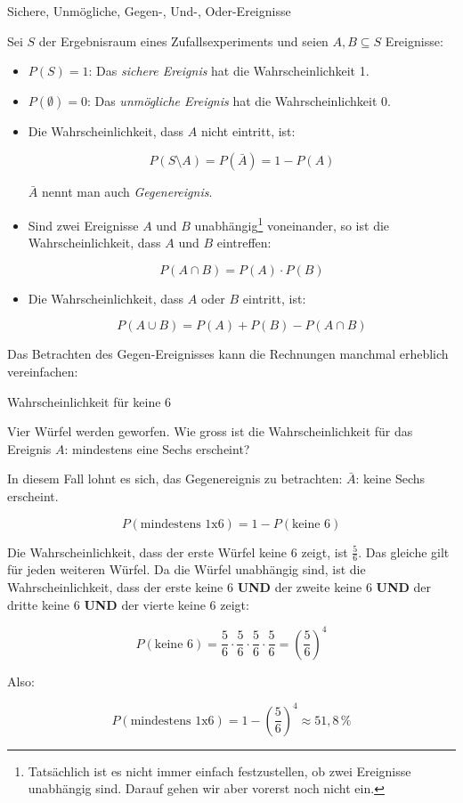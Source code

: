 \begin{definition}
    {Sichere, Unmögliche, Gegen-, Und-, Oder-Ereignisse}{}

Sei \(S\) der Ergebnisraum eines Zufallsexperiments und seien \(A, B \subseteq S\) Ereignisse:

\begin{itemize}
    \item \(P(S) = 1\): Das \emph{sichere Ereignis} hat die Wahrscheinlichkeit 1.
    \item \(P(\emptyset) = 0\): Das \emph{unmögliche Ereignis} hat die Wahrscheinlichkeit 0.


\item Die Wahrscheinlichkeit, dass \(A\) nicht eintritt, ist:

\[
P(S \setminus A) = P(\bar{A}) = 1 - P(A)
\]

\( \bar{A} \) nennt man auch \emph{Gegenereignis}.

\item  Sind zwei Ereignisse \(A\) und \(B\) unabhängig\footnote{Tatsächlich ist es nicht immer einfach festzustellen, ob zwei Ereignisse unabhängig sind. Darauf gehen wir aber vorerst noch nicht ein.} voneinander, so ist die Wahrscheinlichkeit, dass \(A\) und \(B\) eintreffen:

\[
P(A \cap B) = P(A) \cdot P(B)
\]

\item Die Wahrscheinlichkeit, dass \(A\) oder \(B\) eintritt, ist:

\[
P(A \cup B) = P(A) + P(B) - P(A \cap B)
\]

\end{itemize}
\end{definition}

Das Betrachten des Gegen-Ereignisses kann die Rechnungen manchmal erheblich vereinfachen:

\begin{bsp}
    {Wahrscheinlichkeit für keine 6}{}

Vier Würfel werden geworfen. Wie gross ist die Wahrscheinlichkeit für das Ereignis \(A\): mindestens eine Sechs erscheint?

In diesem Fall lohnt es sich, das Gegenereignis zu betrachten: \(\bar{A}\): keine Sechs erscheint.

\[
P(\text{mindestens 1x6}) = 1 - P(\text{keine 6})
\]

Die Wahrscheinlichkeit, dass der erste Würfel keine 6 zeigt, ist \(\frac{5}{6}\). Das gleiche gilt für jeden weiteren Würfel. Da die Würfel unabhängig sind, ist die Wahrscheinlichkeit, dass der erste keine 6 \textbf{UND} der zweite keine 6 \textbf{UND} der dritte keine 6 \textbf{UND} der vierte keine 6 zeigt:

\[
P(\text{keine 6}) = \frac{5}{6} \cdot \frac{5}{6} \cdot \frac{5}{6} \cdot \frac{5}{6} = \left(\frac{5}{6}\right)^4
\]

Also:

\[
P(\text{mindestens 1x6}) = 1 - \left(\frac{5}{6}\right)^4 \approx 51{,}8\,\%
\]

\end{bsp}

